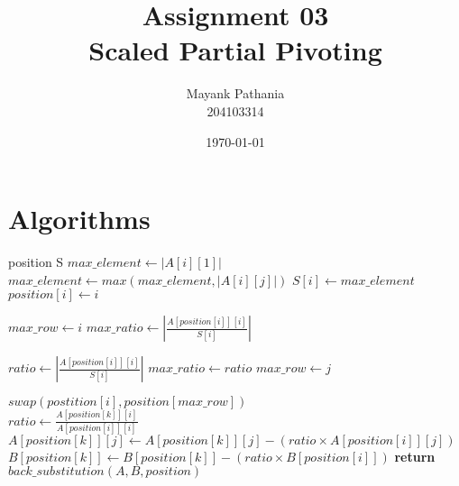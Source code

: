 \documentclass[12pt]{article}
\title{Assignment 03\\
Scaled Partial Pivoting
}
\author{Mayank Pathania\\204103314}
\date{\today}
\begin{document}
\maketitle

\section{Algorithms}
\begin{center}
    \label{euclid}
    \begin{algorithmic}[1]
        \Statex {}
        \Statex {}
        \Statex {}
        \State position 
        \State S 
         
        \State $max\_element \gets |A[i][1]|$
        \State $max\_element \gets max(max\_element,|A[i][j]|)$
        \EndFor
        \State $S[i] \gets max\_element$
        \State $position[i] \gets i$
        \EndFor
        \Statex

        \State $max\_row \gets i$
        \State $max\_ratio \gets |\frac{A[position[i]][i]}{S[i]}|$

         
        \State $ratio \gets |\frac{A[position[i]][i]}{S[i]}|$
        \State $max\_ratio \gets ratio$
        \State $max\_row \gets j$
        \EndIf
        \EndFor
        \Statex

        \State $swap(postition[i],position[max\_row])$\\

         
        \State $ratio \gets \frac{A[position[k]][i]}{A[position[i]][i]}$
        \State $A[position[k]][j] \gets A[position[k]][j] - (ratio \times A[position[i]][j])$
        \EndFor
        \State $B[position[k]] \gets B[position[k]] - (ratio\times B[position[i]])$
        \EndFor
        \EndFor
        \State \textbf{return} $back\_substitution(A,B,position)$ 
        \EndProcedure
    \end{algorithmic}
\end{center}
\end{document}
